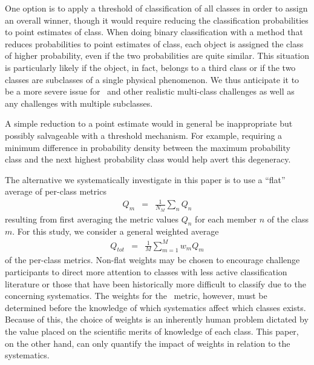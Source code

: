 One option is to apply a threshold of classification of all classes in order to assign an overall winner, though it would require reducing the classification probabilities to point estimates of class.
When doing binary classification with a method that reduces probabilities to point estimates of class, each object is assigned the class of higher probability, even if the two probabilities are quite similar.
This situation is particularly likely if the object, in fact, belongs to a third class or if the two classes are subclasses of a single physical phenomenon.
We thus anticipate it to be a more severe issue for \plasticc\ and other realistic multi-class challenges as well as any challenges with multiple subclasses.

A simple reduction to a point estimate would in general be inappropriate but possibly salvageable with a threshold mechanism.
For example, requiring a minimum difference in probability density between the maximum probability class and the next highest probability class would help avert this degeneracy.

The alternative we systematically investigate in this paper is to use a ``flat'' average of per-class metrics
\begin{eqnarray}
  \label{eq:perclassavg}
Q_{m} &=& \frac{1}{N_{M}}\sum_{n}Q_{n}
\end{eqnarray}
resulting from first averaging the metric values $Q_{n}$ for each member $n$ of the class $m$.
For this study, we consider a general weighted average
\begin{eqnarray}
  \label{eq:weightavg}
Q_{tot} &=& \frac{1}{M}\sum_{m=1}^{M}w_{m}Q_{m}
\end{eqnarray}
of the per-class metrics.
Non-flat weights may be chosen to encourage challenge participants to direct more attention to classes with less active classification literature or those that have been historically more difficult to classify due to the concerning systematics.
The weights for the \plasticc\ metric, however, must be determined before the knowledge of which systematics affect which classes exists.
Because of this, the choice of weights is an inherently human problem dictated by the value placed on the scientific merits of knowledge of each class.
This paper, on the other hand, can only quantify the impact of weights in relation to the systematics.
